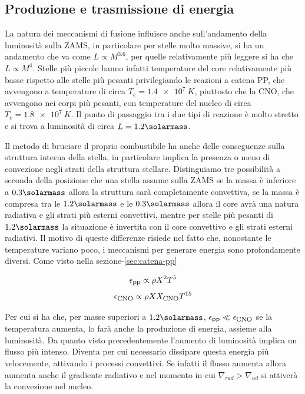 \subsection{Produzione e trasmissione di energia}\label{sec:prod-tras-energia}

La natura dei meccanismi di fusione influisce anche sull'andamento della luminosità sulla ZAMS, in particolare per stelle molto massive, si ha un andamento che va come $L \propto M^{3.6}$, per quelle relativamente più leggere si ha che $L \propto M^4$.  Stelle più piccole hanno infatti temperature del core relativamente più basse rispetto alle stelle più pesanti privilegiando le reazioni a catena PP, che avvengono a temperature di circa $T_e = \SI{1.4e7}{K}$, piuttosto che la CNO, che avvengono nei corpi più pesanti, con temperature del nucleo di circa $T_e = \SI{1.8e7}{K}$. Il punto di passaggio tra i due tipi di reazione è molto stretto e si trova a luminosità di circa $L = 1.2 \si{\solarmass}$.

Il metodo di bruciare il proprio combustibile ha anche delle conseguenze sulla struttura interna della stella, in particolare implica la presenza o meno di convezione negli strati della struttura stellare. Distinguiamo tre possibilità a seconda della posizione che una stella assume sulla ZAMS\: se la massa è inferiore a $0.3 \si{\solarmass}$ allora la struttura sarà completamente convettiva, se la massa è compresa tra le $1.2 \si{\solarmass}$ e le $0.3 \si{\solarmass}$ allora il core avrà una natura radiativa e gli strati più esterni convettivi, mentre per stelle più pesanti di $1.2 \si{\solarmass}$ la situazione è invertita con il core convettivo e gli strati esterni radiativi. Il motivo di queste differenze risiede nel fatto che, nonostante le temperature variano poco, i meccanismi per generare energia sono profondamente diversi. Come visto nella sezione-\ref{sec:catena-pp}

\[
    \epsilon_{\mbox{\footnotesize{pp}}} \propto \rho X^2 T^5
\]
\[
    \epsilon_{\mbox{\footnotesize{CNO}}} \propto \rho X X_{\mbox{\footnotesize{CNO}}} T^{15}
\]

Per cui si ha che, per masse superiori a $1.2 \si{\solarmass}$, $\epsilon_{\mbox{\footnotesize{pp}}} \ll \epsilon_{\mbox{\footnotesize{CNO}}}$ se la temperatura aumenta, lo farà anche la produzione di energia, assieme alla luminosità. Da quanto visto precedentemente l'aumento di luminosità implica un flusso più intenso. Diventa per cui necessario dissipare questa energia più velocemente, attivando i processi convettivi. Se infatti il flusso aumenta allora aumenta anche il gradiente radiativo e nel momento in cui $\nabla_{rad} > \nabla_{ad}$ si attiverà la convezione nel nucleo.

